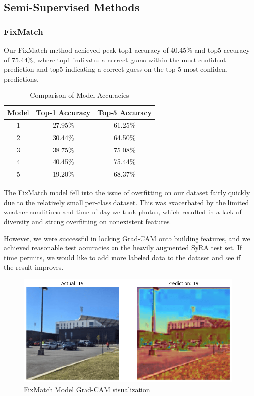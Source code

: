 \documentclass{article}
\begin{document}
\subsection{Semi-Supervised Methods}
\subsubsection{FixMatch}

Our FixMatch method achieved peak top1 accuracy of 40.45\% and top5 accuracy of 75.44\%, where top1 indicates a correct guess within the most confident prediction and top5 indicating a correct guess on the top 5 most confident predictions.

\begin{table}[H]
    \centering
    \begin{tabular}{|c|c|c|}
        \hline
        Model & Top-1 Accuracy & Top-5 Accuracy \\
        \hline
        1 & 27.95\% & 61.25\% \\
        \hline
        2 & 30.44\% & 64.50\% \\
        \hline
        3 & 38.75\% & 75.08\% \\
        \hline
        4 & 40.45\% & 75.44\% \\
        \hline
        5 & 19.20\% & 68.37\% \\
        \hline
    \end{tabular}
    \caption{Comparison of Model Accuracies}
    \label{tab:fm_model_accuracies}
\end{table}

The FixMatch model fell into the issue of overfitting on our dataset fairly quickly due to the relatively small per-class dataset. This was exacerbated by the limited weather conditions and time of day we took photos, which resulted in a lack of diversity and strong overfitting on nonexistent features. 

However, we were successful in locking Grad-CAM onto building features, and we achieved reasonable test accuracies on the heavily augmented SyRA test set. If time permits, we would like to add more labeled data to the dataset and see if the result improves. 

\begin{figure}[H]
    \centering
    \includegraphics[width=0.6\linewidth]{fixmatch.png}
    \caption{FixMatch Model Grad-CAM visualization}
    \label{fig:fixmatch_results}
\end{figure}
\end{document}
